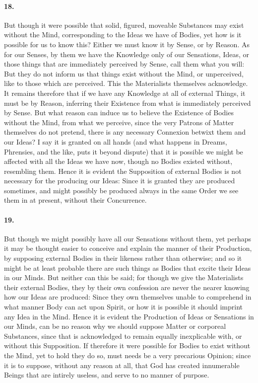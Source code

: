 \documentclass[]{article}
\newenvironment{sectionbody}{\begin{multicols}{2}}{\end{multicols}}
\begin{document}
\begin{sectionbody}
\paragraph{18.} But though it were possible that solid, figured, moveable
Substances may exist without the Mind, corresponding to the Ideas
we have of Bodies, yet how is it possible for us to know this?
Either we must know it by Sense, or by Reason.  As for our
Senses, by them we have the Knowledge only of our Sensations,
Ideas, or those things that are immediately perceived by Sense,
call them what you will: But they do not inform us that things
exist without the Mind, or unperceived, like to those which are
perceived.  This the Materialists themselves acknowledge.  It
remains therefore that if we have any Knowledge at all of
external Things, it must be by Reason, inferring their Existence
from what is immediately perceived by Sense.  But what reason can
induce us to believe the Existence of Bodies without the Mind,
from what we perceive, since the very Patrons of Matter
themselves do not pretend, there is any necessary Connexion
betwixt them and our Ideas? I say it is granted on all hands (and
what happens in Dreams, Phrensies, and the like, puts it beyond
dispute) that it is possible we might be affected with all the
Ideas we have now, though no Bodies existed without, resembling
them.  Hence it is evident the Supposition of external Bodies is
not necessary for the producing our Ideas: Since it is granted
they are produced sometimes, and might possibly be produced
always in the same Order we see them in at present, without their
Concurrence.



\paragraph{19.} But though we might possibly have all our Sensations without
them, yet perhaps it may be thought easier to conceive and
explain the manner of their Production, by supposing external
Bodies in their likeness rather than otherwise; and so it might
be at least probable there are such things as Bodies that excite
their Ideas in our Minds.  But neither can this be said; for
though we give the Materialists their external Bodies, they by
their own confession are never the nearer knowing how our Ideas
are produced: Since they own themselves unable to comprehend in
what manner Body can act upon Spirit, or how it is possible it
should imprint any Idea in the Mind.  Hence it is evident the
Production of Ideas or Sensations in our Minds, can be no reason
why we should suppose Matter or corporeal Substances, since that
is acknowledged to remain equally inexplicable with, or without
this Supposition.  If therefore it were possible for Bodies to
exist without the Mind, yet to hold they do so, must needs be a
very precarious Opinion; since it is to suppose, without any
reason at all, that God has created innumerable Beings that are
intirely useless, and serve to no manner of purpose.




\end{sectionbody}
\end{document}
